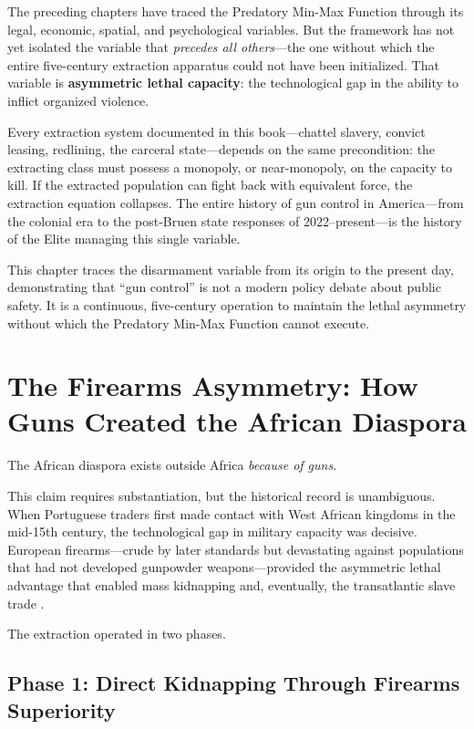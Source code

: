 \documentclass[12pt,openany]{book}
\begin{document}
\medskip

The preceding chapters have traced the Predatory Min-Max Function through its legal, economic, spatial, and psychological variables. But the framework has not yet isolated the variable that \textit{precedes all others}---the one without which the entire five-century extraction apparatus could not have been initialized. That variable is \textbf{asymmetric lethal capacity}: the technological gap in the ability to inflict organized violence.

Every extraction system documented in this book---chattel slavery, convict leasing, redlining, the carceral state---depends on the same precondition: the extracting class must possess a monopoly, or near-monopoly, on the capacity to kill. If the extracted population can fight back with equivalent force, the extraction equation collapses. The entire history of gun control in America---from the colonial era to the post-Bruen state responses of 2022--present---is the history of the Elite managing this single variable.

This chapter traces the disarmament variable from its origin to the present day, demonstrating that ``gun control'' is not a modern policy debate about public safety. It is a continuous, five-century operation to maintain the lethal asymmetry without which the Predatory Min-Max Function cannot execute.

\section{The Firearms Asymmetry: How Guns Created the African Diaspora}

The African diaspora exists outside Africa \textit{because of guns}.

This claim requires substantiation, but the historical record is unambiguous. When Portuguese traders first made contact with West African kingdoms in the mid-15th century, the technological gap in military capacity was decisive. European firearms---crude by later standards but devastating against populations that had not developed gunpowder weapons---provided the asymmetric lethal advantage that enabled mass kidnapping and, eventually, the transatlantic slave trade \cite{thornton}.

The extraction operated in two phases.

\subsection{Phase 1: Direct Kidnapping Through Firearms Superiority}
\end{document}
